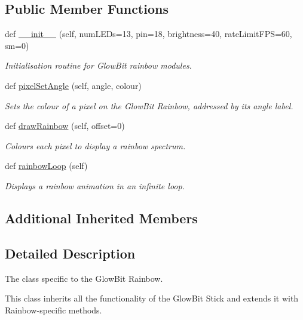 \subsection*{Public Member Functions}
\begin{DoxyCompactItemize}
\item 
def \hyperlink{classglowbit_1_1rainbow_ab1af2d27c10f3ffba7b3ce955cb6229f}{\+\_\+\+\_\+init\+\_\+\+\_\+} (self, num\+L\+E\+Ds=13, pin=18, brightness=40, rate\+Limit\+F\+PS=60, sm=0)
\begin{DoxyCompactList}\small\item\em Initialisation routine for Glow\+Bit rainbow modules. \end{DoxyCompactList}\item 
def \hyperlink{classglowbit_1_1rainbow_a0940825ae934617f95b96e472923f07a}{pixel\+Set\+Angle} (self, angle, colour)
\begin{DoxyCompactList}\small\item\em Sets the colour of a pixel on the Glow\+Bit Rainbow, addressed by its angle label. \end{DoxyCompactList}\item 
def \hyperlink{classglowbit_1_1rainbow_af03e480ce6a5d27780268b242a3fdfa7}{draw\+Rainbow} (self, offset=0)
\begin{DoxyCompactList}\small\item\em Colours each pixel to display a rainbow spectrum. \end{DoxyCompactList}\item 
def \hyperlink{classglowbit_1_1rainbow_a0699f7cc630c57d49c78e93504d3c878}{rainbow\+Loop} (self)
\begin{DoxyCompactList}\small\item\em Displays a rainbow animation in an infinite loop. \end{DoxyCompactList}\end{DoxyCompactItemize}
\subsection*{Additional Inherited Members}


\subsection{Detailed Description}
The class specific to the Glow\+Bit Rainbow. 

This class inherits all the functionality of the Glow\+Bit Stick and extends it with Rainbow-\/specific methods. 

